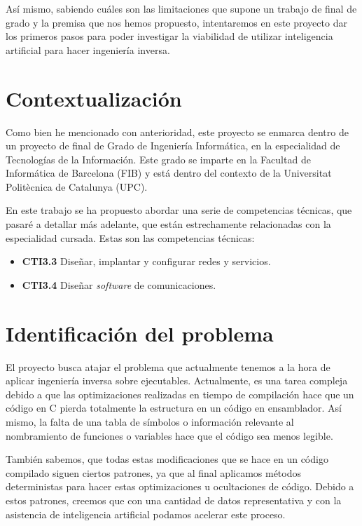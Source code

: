Así mismo, sabiendo cuáles son las limitaciones que supone un trabajo de final de grado y la premisa que nos hemos propuesto, intentaremos en este proyecto dar los primeros pasos
para poder investigar la viabilidad de utilizar inteligencia artificial para hacer ingeniería inversa.

\section{Contextualización}
\label{sec:contextualizacion}


Como bien he mencionado con anterioridad, este proyecto se enmarca dentro de un proyecto de final de Grado de Ingeniería Informática, en la especialidad de Tecnologías de la Información.
Este grado se imparte en la Facultad de Informática de Barcelona (FIB) y está dentro del contexto de la Universitat Politècnica de Catalunya (UPC).

En este trabajo se ha propuesto abordar una serie de competencias técnicas, que pasaré a detallar más adelante, que están estrechamente relacionadas con la especialidad cursada. Estas
son las competencias técnicas:

\begin{itemize}
    \item \textbf{CTI3.3} Diseñar, implantar y configurar redes y servicios.
    \item \textbf{CTI3.4} Diseñar \textit{software} de comunicaciones.
\end{itemize}

\section{Identificación del problema}
\label{sec:problema}


El proyecto busca atajar el problema que actualmente tenemos a la hora de aplicar ingeniería inversa sobre ejecutables. Actualmente, es una tarea compleja debido a que las optimizaciones
realizadas en tiempo de compilación hace que un código en C pierda totalmente la estructura en un código en ensamblador. Así mismo, la falta de una tabla de símbolos o información relevante
al nombramiento de funciones o variables hace que el código sea menos legible.

También sabemos, que todas estas modificaciones que se hace en un código compilado siguen ciertos patrones, ya que al final aplicamos métodos deterministas para hacer estas optimizaciones
u ocultaciones de código. Debido a estos patrones, creemos que con una cantidad de datos representativa y con la asistencia de inteligencia artificial podamos acelerar este proceso.

